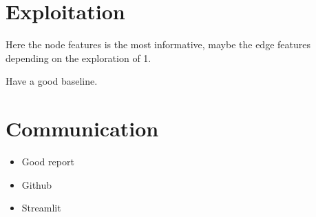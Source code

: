 \documentclass[a4paper,10pt]{article}
\begin{document}
\section{Exploitation}


Here the node features is the most informative, maybe the edge features depending on the exploration of 1.


Have a good baseline.





\section{Communication}


\begin{itemize}
  \item Good report
  \item Github
  \item Streamlit
\end{itemize}



\end{document}
